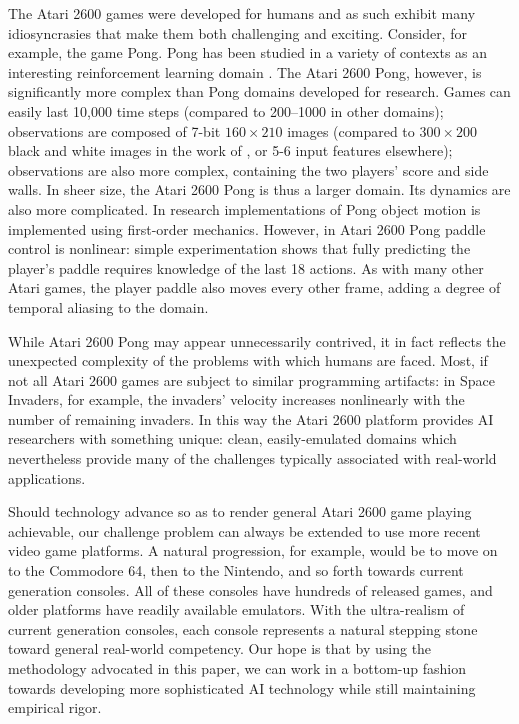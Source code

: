 \documentclass[twoside,11pt]{article}
\newcommand{\gamename}[1]{{\sc #1}}
\begin{document}
The Atari 2600 games were developed for humans and as such exhibit many idiosyncrasies that make them both challenging and exciting. Consider, for example, the game \gamename{Pong}. \gamename{Pong} has been studied in a variety of contexts as an interesting reinforcement learning domain \cite{cobo2011,stober08pixels,monroy06coevolution}. The Atari 2600 \gamename{Pong}, however, is significantly more complex than \gamename{Pong} domains developed for research. Games can easily last 10,000 time steps (compared to 200--1000 in other domains); observations are composed of 7-bit $160 \times 210$ images (compared to $300 \times 200$ black and white images in the work of , or 5-6 input features elsewhere); observations are also more complex, containing the two players' score and side walls. In sheer size, the Atari 2600 \gamename{Pong} is thus a larger domain. Its dynamics are also more complicated.  In research implementations of \gamename{Pong} object motion is implemented using first-order mechanics.  However, in Atari 2600 \gamename{Pong} paddle control is nonlinear: simple experimentation shows that fully predicting the player's paddle requires knowledge of the last 18 actions. As with many other Atari games, the player paddle also moves every other frame, adding a degree of temporal aliasing to the domain. 

While Atari 2600 \gamename{Pong} may appear unnecessarily contrived, it in fact reflects the unexpected complexity of the problems with which humans are faced. Most, if not all Atari 2600 games are subject to similar programming artifacts: in \gamename{Space Invaders}, for example, the invaders' velocity increases nonlinearly with the number of remaining invaders. In this way the Atari 2600 platform provides AI researchers with something unique: clean, easily-emulated domains which nevertheless provide many of the challenges typically associated with real-world applications.

Should technology advance so as to render general Atari 2600 game playing achievable, our challenge problem can always be extended to use more recent video game platforms. A natural progression, for example, would be to move on to the Commodore 64, then to the Nintendo, and so forth towards current generation consoles.
All of these consoles have hundreds of released games, and older platforms have readily available emulators.  With the ultra-realism of current generation consoles, each console represents a natural stepping stone toward general real-world competency.  Our hope is that by using the methodology advocated in this paper, we can work in a bottom-up fashion towards developing more sophisticated AI technology while still maintaining empirical rigor.  
\end{document}
